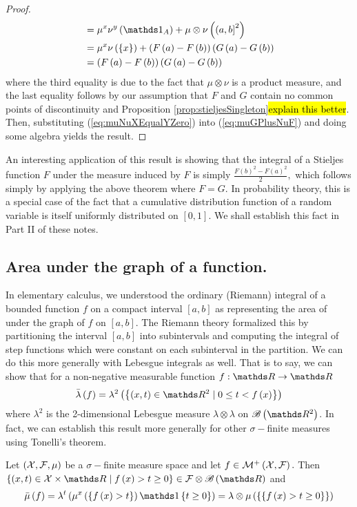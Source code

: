 \begin{proof}
\begin{align}
 & =\mu^{x}\nu^{y}\left(\indicate_{A}\right)+\mu\otimes\nu\left(\left(a,b\right]^{2}\right)\nonumber \\
 & =\mu^{x}\nu\left(\left\{ x\right\} \right)+\left(F\left(a\right)-F\left(b\right)\right)\left(G\left(a\right)-G\left(b\right)\right)\nonumber \\
 & =\left(F\left(a\right)-F\left(b\right)\right)\left(G\left(a\right)-G\left(b\right)\right)\label{eq:muNuXEqualYZero}
\end{align}
where the third equality is due to the fact that $\mu\otimes\nu$
is a product measure, and the last equality follows by our assumption
that $F$ and $G$ contain no common points of discontinuity and Proposition
\ref{prop:stieljesSingleton}\hl{explain this better}. Then, substituting
(\ref{eq:muNuXEqualYZero}) into (\ref{eq:muGPlusNuF}) and doing
some algebra yields the result.
\end{proof}
An interesting application of this result is showing that the integral
of a Stieljes function $F$ under the measure induced by $F$ is simply
$\frac{F\left(b\right)^{2}-F\left(a\right)^{2}}{2},$ which follows
simply by applying the above theorem where $F=G.$ In probability
theory, this is a special case of the fact that a cumulative distribution
function of a random variable is itself uniformly distributed on $\left[0,1\right]$.
We shall establish this fact in Part II of these notes.

\subsection{Area under the graph of a function.}

In elementary calculus, we understood the ordinary (Riemann) integral
of a bounded function $f$ on a compact interval $\left[a,b\right]$
as representing the area of under the graph of $f$ on $\left[a,b\right].$
The Riemann theory formalized this by partitioning the interval $\left[a,b\right]$
into subintervals and computing the integral of step functions which
were constant on each subinterval in the partition. We can do this
more generally with Lebesgue integrals as well. That is to say, we
can show that for a non-negative measurable function $f:\R\to\R$
\[
\lebInt{\lambda}f=\lambda^{2}\left(\left\{ \left(x,t\right)\in\R^{2}\mid0\leq t<f\left(x\right)\right\} \right)
\]
where $\lambda^{2}$ is the 2-dimensional Lebesgue measure $\lambda\otimes\lambda$
on $\borel\left(\R^{2}\right)$. In fact, we can establish this result
more generally for other $\sigma-$finite measures using Tonelli's
theorem.
\begin{thm}
\label{thm:areaUnderGraphLebesgue}Let $\left(\mathcal{X},\mathcal{F},\mu\right)$ be a $\sigma-$finite
measure space and let $f\in\mathcal{M}^{+}\left(\mathcal{X},\mathcal{F}\right).$ Then $\left\{ \left(x,t\right)\in\X\times\R\mid f\left(x\right)>t\geq0\right\} \in\F\otimes\borel\left(\R\right)$
and
\[
\lebInt{\mu}f=\lambda^{t}\left(\mu^{x}\left(\left\{ f\left(x\right)>t\right\} \right)\indicate\left\{ t\geq0\right\} \right)=\lambda\otimes\mu\left(\left\{ \left\{ f\left(x\right)>t\geq0\right\} \right\} \right)
\]
\end{thm}

